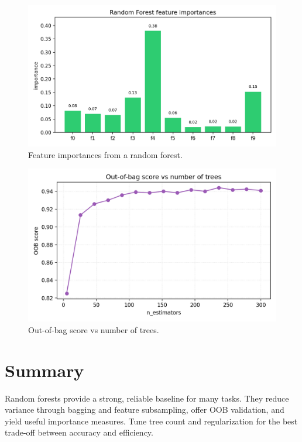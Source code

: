 \documentclass[11pt]{article}
\begin{document}
\begin{figure}[H]
  \centering
  \includegraphics[width=0.85\linewidth]{rf_feature_importances.png}
  \caption{Feature importances from a random forest.}
  \label{fig:rf_fi}
\end{figure}
\FloatBarrier

\begin{figure}[H]
  \centering
  \includegraphics[width=0.85\linewidth]{rf_oob_curve.png}
  \caption{Out-of-bag score vs number of trees.}
  \label{fig:rf_oob}
\end{figure}
\FloatBarrier

\section{Summary}
Random forests provide a strong, reliable baseline for many tasks. They reduce variance through bagging and feature subsampling, offer OOB validation, and yield useful importance measures. Tune tree count and regularization for the best trade-off between accuracy and efficiency.
\end{document}
